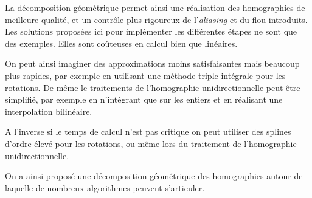 
La décomposition géométrique permet ainsi une réalisation des homographies de meilleure qualité, et un contrôle plus rigoureux de l'\emph{aliasing} et du flou introduits. Les solutions proposées ici pour implémenter les différentes étapes ne sont que des exemples. Elles sont coûteuses en calcul bien que linéaires. 

On peut ainsi imaginer des approximations moins satisfaisantes mais beaucoup plus rapides, par exemple en utilisant une méthode triple intégrale pour les rotations. De même le traitements de l'homographie unidirectionnelle peut-être simplifié, par exemple en n'intégrant que sur les entiers et en réalisant une interpolation bilinéaire.

A l'inverse si le temps de calcul n'est pas critique on peut utiliser des splines d'ordre élevé pour les rotations, ou même lors du traitement de l'homographie unidirectionnelle.

On a ainsi proposé une décomposition géométrique des homographies autour de laquelle de nombreux algorithmes peuvent s'articuler.

